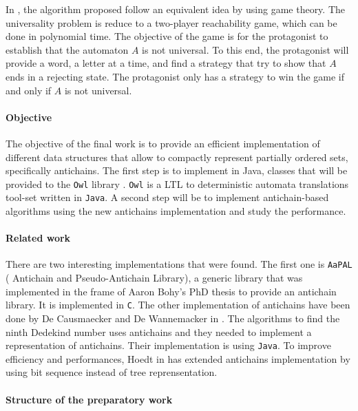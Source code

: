 \documentclass[letterpaper]{article}
\theoremstyle{definition}
\begin{document}
In
\cite{AC_universality}, the algorithm proposed follow an equivalent
idea by using game theory. The universality problem is reduce to
a two-player reachability game, which can be done in polynomial time.
The objective of the game is for the protagonist to establish that
the automaton $A$ is not universal. To this end, the protagonist will
provide a word, a letter at a time, and find a strategy that try
to show that $A$ ends in a rejecting state.
The protagonist only has a strategy to win the game if and only if $A$ is
not universal.

\paragraph{Objective}

The objective of the final work
is to provide an efficient implementation of different
data structures that allow to compactly
represent partially ordered sets, specifically antichains.
The first step is to implement in Java, classes that will be provided to
the \texttt{Owl} library \cite{owl}.
\texttt{Owl} is a LTL to deterministic automata translations tool-set written
in \texttt{Java}. A second step will be to implement
antichain-based algorithms using the new antichains implementation and
study the performance.

\paragraph{Related work}

There are two interesting implementations that were found.
The first one is \texttt{AaPAL} (
Antichain and Pseudo-Antichain Library), a generic
library that was implemented in the frame of
Aaron Bohy's PhD thesis \cite{bohy_phd}
to provide an antichain library. It is implemented in \texttt{C}.
The other implementation of antichains
have been done
by De Causmaecker and De Wannemacker in \cite{causemaecker1}. The algorithms
to find the ninth Dedekind number uses antichains and they needed to
implement a representation of antichains. Their implementation is using
\texttt{Java}.
To improve efficiency and performances, Hoedt in \cite{hoedt} has extended
\cite{causemaecker1} antichains implementation by using bit sequence
instead of tree reprensentation.

\paragraph{Structure of the preparatory work}
\end{document}
